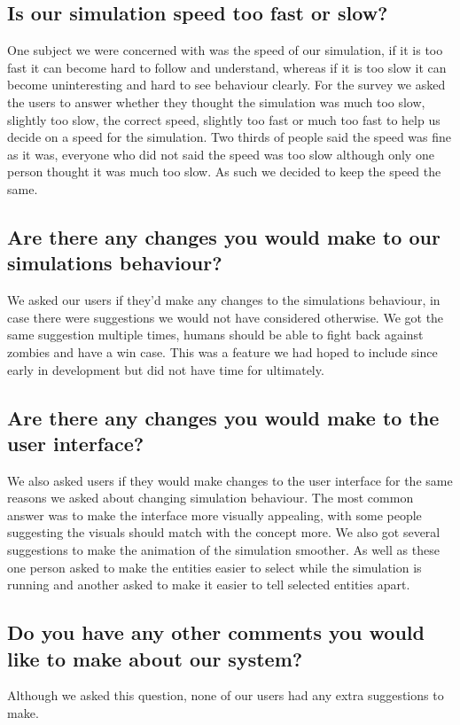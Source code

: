 \subsection{Is our simulation speed too fast or slow?}

One subject we were concerned with was the speed of our simulation, if it is too fast it can become hard to follow and understand, whereas if it is too slow it can become uninteresting and hard to see behaviour clearly. For the survey we asked the users to answer whether they thought  the simulation was much too slow, slightly too slow, the correct speed, slightly too fast or much too fast to help us decide on a speed for the simulation. Two thirds of people said the speed was fine as it was, everyone who did not said the speed was too slow although only one person thought it was much too slow. As such we decided to keep the speed the same.


\subsection{Are there any changes you would make to our simulations behaviour?}

We asked our users if they'd make any changes to the simulations behaviour, in case there were suggestions we would not have considered otherwise. We got the same suggestion multiple times, humans should be able to fight back against zombies and have a win case.  This was a feature we had hoped to include since early in development but did not have time for ultimately.

\subsection{Are there any changes you would make to the user interface?}

We also asked users if they would make changes to the user interface for the same reasons we asked about changing simulation behaviour. The most common answer was to make the interface more visually appealing, with some people suggesting the visuals should match with the concept more.
We also got several suggestions to make the animation of the simulation smoother. As well as these one person asked to make the entities easier to select while the simulation is running and another asked to make it easier to tell selected entities apart.

\subsection{Do you have any other comments you would like to make about our system?}

Although we asked this question, none of our users had any extra suggestions to make.

\clearpage
\endinput
